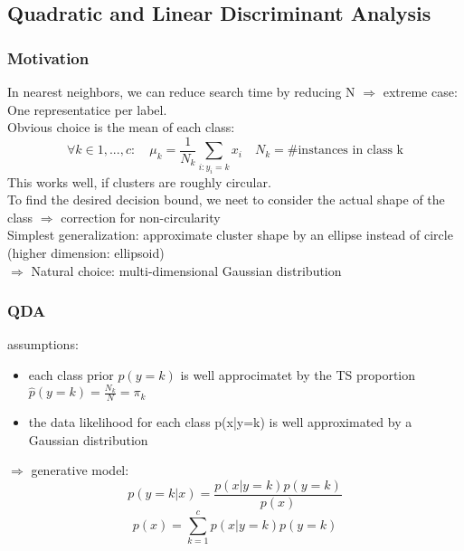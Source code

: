 \documentclass[11pt]{article}
\begin{document}
    \subsection{Quadratic and Linear Discriminant Analysis}
      \subsubsection{Motivation}
        In nearest neighbors, we can reduce search time by reducing N
        $\Rightarrow$ extreme case: One representatice per label. \\
        Obvious choice is the mean of each class:
        \begin{equation*}
          \forall k \in 1,...,c: \quad \mu_k = \frac{1}{N_k} \sum_{i:y_i=k}x_i
          \quad N_k = \text{#instances in class k}
        \end{equation*}
        This works well, if clusters are roughly circular. \\
        To find the desired decision bound, we neet to consider the
        actual shape of the class $\Rightarrow$ correction for non-circularity \\
        Simplest generalization: approximate cluster shape by an ellipse instead
        of circle (higher dimension: ellipsoid) \\
        $\Rightarrow$ Natural choice: multi-dimensional Gaussian distribution
      \subsubsection{QDA}
        assumptions:
        \begin{itemize}
          \item each class prior $p(y=k)$ is well approcimatet by the TS
          proportion $\hat{p}(y=k)=\frac{N_k}{N}=\pi_k$
          \item the data likelihood for each class p(x|y=k) is well approximated
          by a Gaussian distribution
        \end{itemize}
        $\Rightarrow$ generative model:
        \begin{equation*}
           p(y=k|x) = \frac{p(x|y=k)p(y=k)}{p(x)}
        \end{equation*}
        \begin{equation*}
          p(x) = \sum_{k=1}^{c}p(x|y=k)p(y=k)
        \end{equation*}
\end{document}

